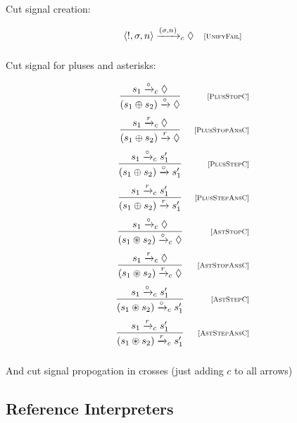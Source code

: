 Cut signal creation:

  \[
  \begin{array}{cr}
    \left<{!, \sigma, n}\right> \xrightarrow{(\sigma, n)}_c \Diamond &\mbox{\scriptsize{[\textsc{UnifyFail}]}} \\[2mm]
  \end{array}
\]

Cut signal for pluses and asterisks:

  \[
  \begin{array}{cr}
    \dfrac{s_1 \xrightarrow{\circ}_c \Diamond}{(s_1 \oplus s_2) \xrightarrow{\circ} \Diamond} & \mbox{\scriptsize{[\textsc{PlusStopC}]}}\\[5mm]
    \dfrac{s_1 \xrightarrow{r}_c \Diamond}{(s_1 \oplus s_2) \xrightarrow{r} \Diamond} & \mbox{\scriptsize{[\textsc{PlusStopAnsC}]}}\\[5mm]
    \dfrac{s_1 \xrightarrow{\circ}_c s'_1}{(s_1 \oplus s_2) \xrightarrow{\circ} s'_1} &\mbox{\scriptsize{[\textsc{PlusStepC}]}}\\[5mm]
    \dfrac{s_1 \xrightarrow{r}_c s'_1}{(s_1 \oplus s_2) \xrightarrow{r} s'_1} &\mbox{\scriptsize{[\textsc{PlusStepAnsC}]}}\\[5mm]
    \dfrac{s_1 \xrightarrow{\circ}_c \Diamond}{(s_1 \circledast s_2) \xrightarrow{\circ}_c \Diamond} & \mbox{\scriptsize{[\textsc{AstStopC}]}}\\[5mm]
    \dfrac{s_1 \xrightarrow{r}_c \Diamond}{(s_1 \circledast s_2) \xrightarrow{r}_c \Diamond} & \mbox{\scriptsize{[\textsc{AstStopAnsC}]}}\\[5mm]
    \dfrac{s_1 \xrightarrow{\circ}_c s'_1}{(s_1 \circledast s_2) \xrightarrow{\circ}_c s'_1} &\mbox{\scriptsize{[\textsc{AstStepC}]}}\\[5mm]
    \dfrac{s_1 \xrightarrow{r}_c s'_1}{(s_1 \circledast s_2) \xrightarrow{r}_c s'_1} &\mbox{\scriptsize{[\textsc{AstStepAnsC}]}}\\[5mm]
  \end{array}
  \]
  
And cut signal propogation in crosses (just adding $c$ to all arrows)

\subsection{Reference Interpreters}
